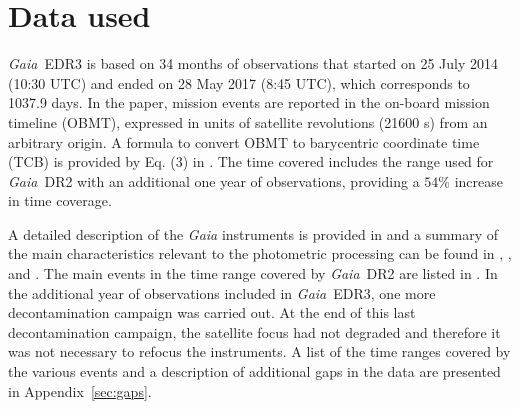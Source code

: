 \documentclass{aa}
\newcommand{\gaia}{\textit{Gaia}\xspace}
\newcommand{\drt}{\gaia~DR2\xspace}
\newcommand{\edr}{\gaia~EDR3\xspace}
\newcommand{\appref}[1]{Appendix~\ref{sec:#1}}
\begin{document}

\section{Data used}\label{sec:data}

\edr is based on 34 months of observations that started on 25 July 2014 (10:30 UTC) and ended on 28 May 2017 (8:45 UTC), which corresponds to 1037.9 days. In the paper, mission events are reported in the on-board mission timeline (OBMT), expressed in units of satellite revolutions (21600 s) from an arbitrary origin. A formula to convert OBMT to barycentric coordinate time (TCB) is provided by Eq. (3) in  \cite{GaiaRef}. The time covered includes the range used for \drt with an additional one year of observations, providing a $54\%$ increase in time coverage.

A detailed description of the \gaia instruments is provided in \cite{GaiaRef} and a summary of the main characteristics relevant to the photometric processing can be found in \cite{Proc_DR2}, \cite{Phot_DR2}, and \cite{PhotCore}. 
The main events in the time range covered by \drt are listed in \cite{Proc_DR2}. In the additional year of observations included in \edr, one more decontamination campaign was carried out. At the end of this last decontamination campaign, the satellite focus had not degraded and therefore it was not necessary to refocus the instruments. A list of the time ranges covered by the various events and a description of additional gaps in the data are presented in \appref{gaps}.
\end{document}
